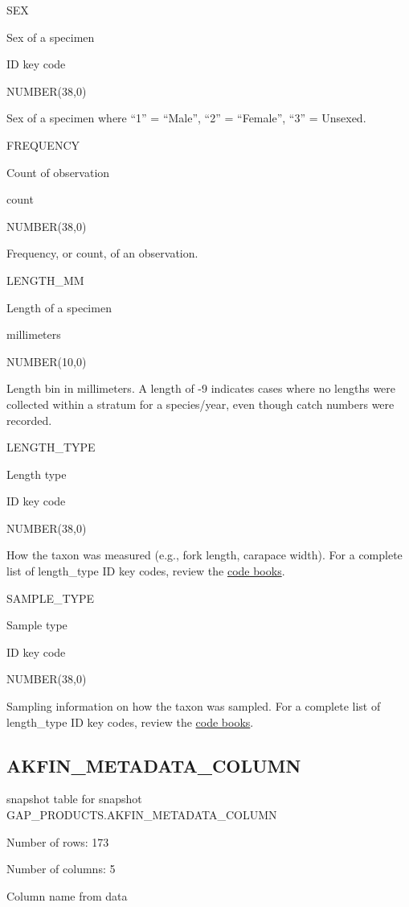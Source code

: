 \documentclass[
  letterpaper,
  oneside,
  open=any]{scrbook}
\begin{document}
SEX

Sex of a specimen

ID key code

NUMBER(38,0)

Sex of a specimen where ``1'' = ``Male'', ``2'' = ``Female'', ``3'' =
Unsexed.

FREQUENCY

Count of observation

count

NUMBER(38,0)

Frequency, or count, of an observation.

LENGTH\_MM

Length of a specimen

millimeters

NUMBER(10,0)

Length bin in millimeters. A length of -9 indicates cases where no
lengths were collected within a stratum for a species/year, even though
catch numbers were recorded.

LENGTH\_TYPE

Length type

ID key code

NUMBER(38,0)

How the taxon was measured (e.g., fork length, carapace width). For a
complete list of length\_type ID key codes, review the
\href{https://www.fisheries.noaa.gov/resource/document/groundfish-survey-species-code-manual-and-data-codes-manual}{code
books}.

SAMPLE\_TYPE

Sample type

ID key code

NUMBER(38,0)

Sampling information on how the taxon was sampled. For a complete list
of length\_type ID key codes, review the
\href{https://www.fisheries.noaa.gov/resource/document/groundfish-survey-species-code-manual-and-data-codes-manual}{code
books}.

\subsection{AKFIN\_METADATA\_COLUMN}\label{akfin_metadata_column}

snapshot table for snapshot GAP\_PRODUCTS.AKFIN\_METADATA\_COLUMN

Number of rows: 173

Number of columns: 5

Column name from data
\end{document}
